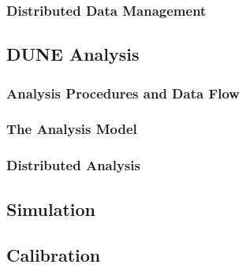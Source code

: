 \subsubsection{Distributed Data Management}

\subsection{DUNE Analysis}
\subsubsection{Analysis Procedures and Data Flow}
\subsubsection{The Analysis Model}
\subsubsection{Distributed Analysis}

\subsection{Simulation}
\subsection{Calibration}
